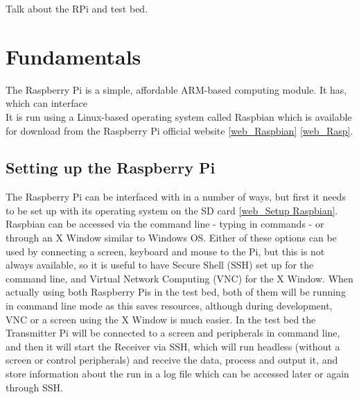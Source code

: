 \documentclass[../main.tex]{subfiles}
\begin{document}
Talk about the RPi and test bed.


\section{Fundamentals}

The Raspberry Pi is a simple, affordable ARM-based computing module. It has, which can interface\\

It is run using a Linux-based operating system called Raspbian which is available for download from the Raspberry Pi official website \ref{web_Raspbian} \ref{web_Rasp}.\\

\subsection{Setting up the Raspberry Pi}

The Raspberry Pi can be interfaced with in a number of ways, but first it needs to be set up with its operating system on the SD card \ref{web_Setup Raspbian}.
Raspbian can be accessed via the command line - typing in commands - or through an X Window similar to Windows OS.
Either of these options can be used by connecting a screen, keyboard and mouse to the Pi, but this is not always available, so it is useful to have Secure Shell (SSH) set up for the command line, and Virtual Network Computing (VNC) for the X Window.
When actually using both Raspberry Pis in the test bed, both of them will be running in command line mode as this saves resources, although during development, VNC or a screen using the X Window is much easier.
In the test bed the Transmitter Pi will be connected to a screen and peripherals in command line, and then it will start the Receiver via SSH, which will run headless (without a screen or control peripherals) and receive the data, process and output it, and store information about the run in a log file which can be accessed later or again through SSH.\\
\end{document}
